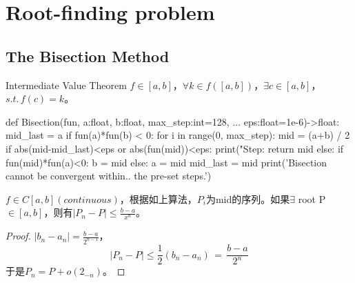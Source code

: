 \section{Root-finding problem}
\subsection{The Bisection Method}
\begin{theo}{Intermediate Value Theorem}
$f \in [a,b]$，$\forall k \in f([a,b])$，$\exists c\in [a,b]$，$s.t.\,f(c)=k$。
\end{theo}
\begin{python}
def Bisection(fun, a:float, b:float, max_step:int=128, ...
    eps:float=1e-6)->float:
    mid_last = a
    if fun(a)*fun(b) < 0:
        for i in range(0, max_step):
            mid = (a+b) / 2
            if abs(mid-mid_last)<eps or abs(fun(mid))<eps:
                print("Step: %
                return mid
            else:
                if fun(mid)*fun(a)<0:
                    b = mid
                else:
                    a = mid
            mid_last = mid
        print('Bisection cannot be convergent within..
               the pre-set steps.')
\end{python}
\begin{theo}{}
$f\in C[a,b](continuous)$，根据如上算法，$P_i$为mid的序列。如果$\exists$ root P$\in[a,b]$，则有$\left|P_n-P\right|\leq\frac{b-a}{x^n}$。
\end{theo}
\begin{proof}
$\left|b_n-a_n\right|=\frac{b-a}{2^{n-1}}$，
\[
\left|P_n-P\right|\leq\frac{1}{2}(b_n-a_n)\,=\,\frac{b-a}{2^n}
\]
于是$P_n = P + o(2_{-n})$。
\end{proof}

